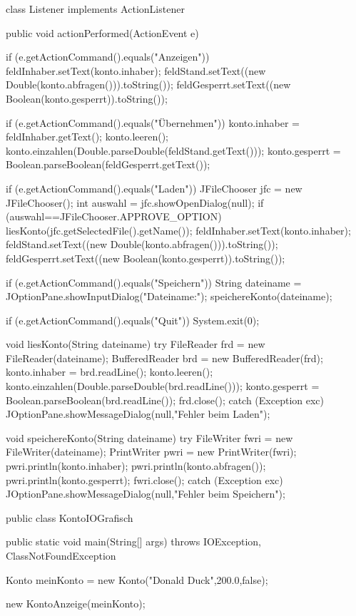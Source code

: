 \begin{mycodebox}[caption={Codelisting über mehrere Seiten},label={lst:CodelistMultipage},language=Java]
{ class Listener implements ActionListener {

  public void actionPerformed(ActionEvent e) {

   if (e.getActionCommand().equals("Anzeigen")) {
     feldInhaber.setText(konto.inhaber);
     feldStand.setText((new Double(konto.abfragen())).toString());
     feldGesperrt.setText((new Boolean(konto.gesperrt)).toString());
    }

   if (e.getActionCommand().equals("Übernehmen")) {
     konto.inhaber = feldInhaber.getText();
     konto.leeren();
     konto.einzahlen(Double.parseDouble(feldStand.getText()));
     konto.gesperrt = Boolean.parseBoolean(feldGesperrt.getText());
    }

   if (e.getActionCommand().equals("Laden")) {
     JFileChooser jfc = new JFileChooser();
     int auswahl = jfc.showOpenDialog(null);
     if (auswahl==JFileChooser.APPROVE_OPTION) {
       liesKonto(jfc.getSelectedFile().getName());
       feldInhaber.setText(konto.inhaber);
       feldStand.setText((new Double(konto.abfragen())).toString());
       feldGesperrt.setText((new Boolean(konto.gesperrt)).toString());
      }
    }

   if (e.getActionCommand().equals("Speichern")) {
     String dateiname = JOptionPane.showInputDialog("Dateiname:");
     speichereKonto(dateiname);
    }

   if (e.getActionCommand().equals("Quit"))
    System.exit(0);

  }

 }
 
 void liesKonto(String dateiname) {
  try {
   FileReader frd = new FileReader(dateiname);
   BufferedReader brd = new BufferedReader(frd);
   konto.inhaber = brd.readLine();
   konto.leeren();
   konto.einzahlen(Double.parseDouble(brd.readLine()));
   konto.gesperrt = Boolean.parseBoolean(brd.readLine());
   frd.close();
  } catch (Exception exc) { JOptionPane.showMessageDialog(null,"Fehler beim Laden"); }
 }

 void speichereKonto(String dateiname) {
  try {
   FileWriter fwri = new FileWriter(dateiname);
   PrintWriter pwri = new PrintWriter(fwri);
   pwri.println(konto.inhaber);
   pwri.println(konto.abfragen());
   pwri.println(konto.gesperrt);
   fwri.close();
  } catch (Exception exc) { JOptionPane.showMessageDialog(null,"Fehler beim Speichern"); }
 }

}

public class KontoIOGrafisch {

 public static void main(String[] args) throws IOException, ClassNotFoundException {
 
  Konto meinKonto = new Konto("Donald Duck",200.0,false);
  
  new KontoAnzeige(meinKonto);

 }
 
}


\end{mycodebox}
